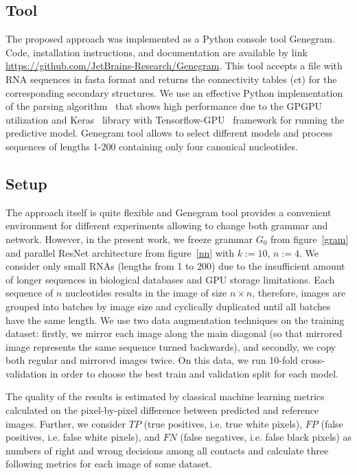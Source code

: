 \subsection{Tool}
The proposed approach was implemented as a Python console tool Genegram. Code, installation instructions, and documentation are available by link \linebreak \url{https://github.com/JetBrains-Research/Genegram}. This tool accepts a file with RNA sequences in fasta format and returns the connectivity tables (ct) for the corresponding secondary structures. We use an effective Python implementation of the parsing algorithm~\cite{Azimov:2018:CPQ:3210259.3210264} that shows high performance due to the GPGPU utilization and Keras~\cite{chollet2015keras} library with Tensorflow-GPU~\cite{tensorflow2015-whitepaper} framework for running the predictive model. Genegram tool allows to select different models and process sequences of lengths 1-200 containing only four canonical nucleotides.

\subsection{Setup}
The approach itself is quite flexible and Genegram tool provides a convenient environment for different experiments allowing to change both grammar and network. However, in the present work, we freeze grammar $G_0$ from figure~\ref{gram} and parallel ResNet architecture from figure~\ref{nn} with $k := 10$, $n := 4$. We consider only small RNAs (lengths from 1 to 200) due to the insufficient amount of longer sequences in biological databases and GPU storage limitations. Each sequence of $n$ nucleotides results in the image of size $n \times n$, therefore, images are grouped into batches by image size and cyclically duplicated until all batches have the same length. We use two data augmentation techniques on the training dataset: firstly, we mirror each image along the main diagonal (so that mirrored image represents the same sequence turned backwards), and secondly, we copy both regular and mirrored images twice. On this data, we run 10-fold cross-validation in order to choose the best train and validation split for each model.

The quality of the results is estimated by classical machine learning metrics calculated on the pixel-by-pixel difference between predicted and reference images. Further, we consider $TP$ (true positives, i.e. true white pixels), $FP$ (false positives, i.e. false white pixels), and $FN$ (false negatives, i.e. false black pixels) as numbers of right and wrong decisions among all contacts and calculate three following metrics for each image of some dataset. 

